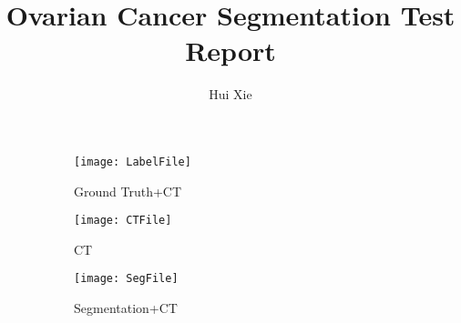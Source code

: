 \documentclass[12pt]{article}
\title{Ovarian Cancer Segmentation Test Report}
\author{Hui Xie}
\begin{document}
\maketitle


\begin{figure}
	\begin{subfigure}{\linewidth}
		\centering
		\texttt{[image: LabelFile]}
		\caption{Ground Truth+CT}
	\end{subfigure}

	\begin{subfigure}{\linewidth}
		\centering
		\texttt{[image: CTFile]}
		\caption{CT}
	\end{subfigure}

	\begin{subfigure}{\linewidth}
		\centering
		\texttt{[image: SegFile]}
    	\caption{Segmentation+CT}
	\end{subfigure}

\caption{}
\end{figure}

\clearpage  %
\end{document}
